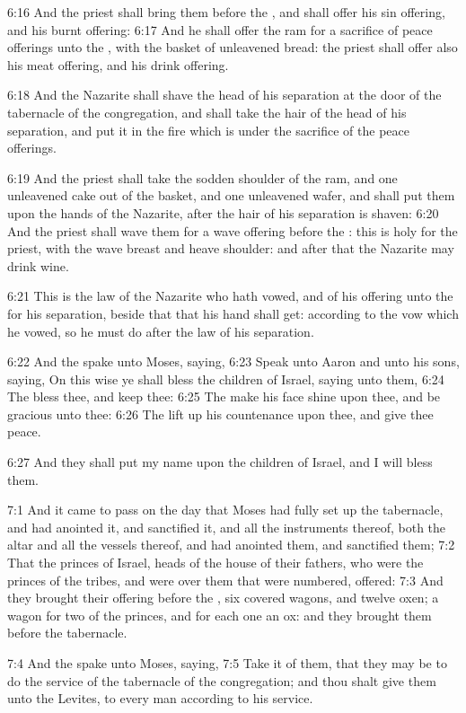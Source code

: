 6:16 And the priest shall bring them before the \LORD, and shall offer
his sin offering, and his burnt offering: 6:17 And he shall offer the
ram for a sacrifice of peace offerings unto the \LORD, with the basket
of unleavened bread: the priest shall offer also his meat offering,
and his drink offering.

6:18 And the Nazarite shall shave the head of his separation at the
door of the tabernacle of the congregation, and shall take the hair of
the head of his separation, and put it in the fire which is under the
sacrifice of the peace offerings.

6:19 And the priest shall take the sodden shoulder of the ram, and one
unleavened cake out of the basket, and one unleavened wafer, and shall
put them upon the hands of the Nazarite, after the hair of his
separation is shaven: 6:20 And the priest shall wave them for a wave
offering before the \LORD: this is holy for the priest, with the wave
breast and heave shoulder: and after that the Nazarite may drink wine.

6:21 This is the law of the Nazarite who hath vowed, and of his
offering unto the \LORD for his separation, beside that that his hand
shall get: according to the vow which he vowed, so he must do after
the law of his separation.

6:22 And the \LORD spake unto Moses, saying, 6:23 Speak unto Aaron and
unto his sons, saying, On this wise ye shall bless the children of
Israel, saying unto them, 6:24 The \LORD bless thee, and keep thee:
6:25 The \LORD make his face shine upon thee, and be gracious unto
thee: 6:26 The \LORD lift up his countenance upon thee, and give thee
peace.

6:27 And they shall put my name upon the children of Israel, and I
will bless them.

7:1 And it came to pass on the day that Moses had fully set up the
tabernacle, and had anointed it, and sanctified it, and all the
instruments thereof, both the altar and all the vessels thereof, and
had anointed them, and sanctified them; 7:2 That the princes of
Israel, heads of the house of their fathers, who were the princes of
the tribes, and were over them that were numbered, offered: 7:3 And
they brought their offering before the \LORD, six covered wagons, and
twelve oxen; a wagon for two of the princes, and for each one an ox:
and they brought them before the tabernacle.

7:4 And the \LORD spake unto Moses, saying, 7:5 Take it of them, that
they may be to do the service of the tabernacle of the congregation;
and thou shalt give them unto the Levites, to every man according to
his service.

